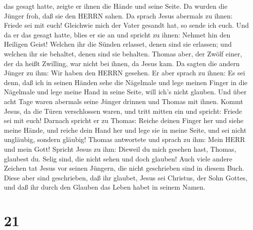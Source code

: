 das gesagt hatte, zeigte er ihnen die Hände und seine Seite. Da wurden
die Jünger froh, daß sie den HERRN sahen.  Da sprach Jesus
abermals zu ihnen: Friede sei mit euch! Gleichwie mich der Vater gesandt
hat, so sende ich euch.  Und da er das gesagt hatte, blies
er sie an und spricht zu ihnen: Nehmet hin den Heiligen Geist!
 Welchen ihr die Sünden erlasset, denen sind sie erlassen;
und welchen ihr sie behaltet, denen sind sie behalten. 
Thomas aber, der Zwölf einer, der da heißt Zwilling, war nicht bei
ihnen, da Jesus kam.  Da sagten die andern Jünger zu ihm:
Wir haben den HERRN gesehen. Er aber sprach zu ihnen: Es sei denn, daß
ich in seinen Händen sehe die Nägelmale und lege meinen Finger in die
Nägelmale und lege meine Hand in seine Seite, will ich's nicht glauben.
 Und über acht Tage waren abermals seine Jünger drinnen und
Thomas mit ihnen. Kommt Jesus, da die Türen verschlossen waren, und
tritt mitten ein und spricht: Friede sei mit euch!  Darnach
spricht er zu Thomas: Reiche deinen Finger her und siehe meine Hände,
und reiche dein Hand her und lege sie in meine Seite, und sei nicht
ungläubig, sondern gläubig!  Thomas antwortete und sprach
zu ihm: Mein HERR und mein Gott!  Spricht Jesus zu ihm:
Dieweil du mich gesehen hast, Thomas, glaubest du. Selig sind, die nicht
sehen und doch glauben!  Auch viele andere Zeichen tat
Jesus vor seinen Jüngern, die nicht geschrieben sind in diesem Buch.
 Diese aber sind geschrieben, daß ihr glaubet, Jesus sei
Christus, der Sohn Gottes, und daß ihr durch den Glauben das Leben habet
in seinem Namen.

\hypertarget{section-20}{%
\section{21}\label{section-20}}

